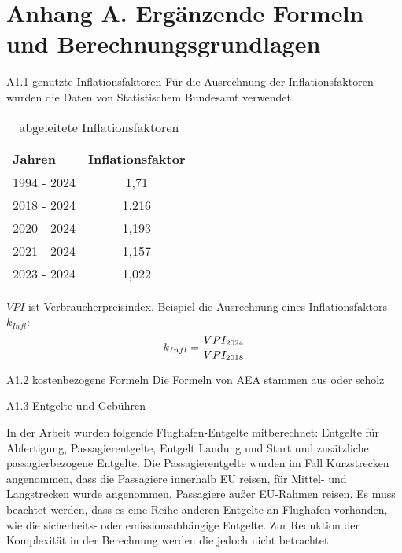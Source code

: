 \chapter{Anhang A. Ergänzende Formeln und Berechnungsgrundlagen}
A1.1 genutzte Inflationsfaktoren
Für die Ausrechnung der Inflationsfaktoren wurden die Daten von Statistischem Bundesamt verwendet. 
\begin{table}[h]
	\begin{center}
    \caption{abgeleitete Inflationsfaktoren}
	\label{Inflationsfaktoren}
	\begin{tabular}{|l|c|}
		\hline
		Jahren & \textbf{Inflationsfaktor} \\ \hline
		1994 - 2024 & 1,71 \\ \hline
		2018 - 2024 & 1,216 \\ \hline
		2020 - 2024 & 1,193 \\ \hline
        2021 - 2024 & 1,157 \\ \hline
        2023 - 2024 & 1,022 \\ \hline
	\end{tabular}
    \end{center}
\end{table}

$VPI$ ist Verbraucherpreisindex. Beispiel die Ausrechnung eines Inflationsfaktors $k_{Infl}$:
\begin{equation}
	{k_{Infl}} = \frac{VPI_{2024}}{VPI_{2018}} \\
	\label{inflation}
 \end{equation}

A1.2 kostenbezogene Formeln
Die Formeln von AEA stammen aus \cite{minwoo2019analysis} oder scholz

A1.3 Entgelte und Gebühren

In der Arbeit wurden folgende Flughafen-Entgelte mitberechnet: Entgelte für Abfertigung, Passagierentgelte, Entgelt Landung und Start
und zusätzliche passagierbezogene Entgelte. Die Passagierentgelte wurden im Fall Kurzstrecken angenommen,
dass die Passagiere innerhalb EU reisen, für Mittel- und Langstrecken wurde angenommen, Passagiere außer EU-Rahmen reisen.
Es muss beachtet werden, dass es eine Reihe anderen Entgelte an Flughäfen vorhanden, 
wie die sicherheits- oder emissionsabhängige Entgelte. Zur Reduktion der Komplexität in der Berechnung werden die jedoch nicht betrachtet.

